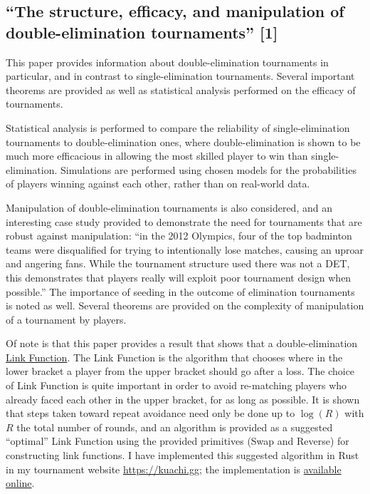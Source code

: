 \documentclass[a4,11pt,twoside,final]{article}
\makeatletter
\newcommand{\cslcitation}[2]
 {\protect\hyper@linkstart{cite}{citeproc_bib_item_#1}#2\hyper@linkend}
\makeatother
\begin{document}
\subsection{``The structure, efficacy, and manipulation of double-elimination tournaments'' \cslcitation{1}{[1]}}
\label{sec:org9284aad}

This paper provides information about double-elimination tournaments in
particular, and in contrast to single-elimination tournaments. Several important
theorems are provided as well as statistical analysis performed on the efficacy
of tournaments.

Statistical analysis is performed to compare the reliability of
single-elimination tournaments to double-elimination ones, where
double-elimination is shown to be much more efficacious in allowing the most
skilled player to win than single-elimination. Simulations are performed using
chosen models for the probabilities of players winning against each other, rather
than on real-world data.

Manipulation of double-elimination tournaments is also considered, and an
interesting case study provided to demonstrate the need for tournaments that are
robust against manipulation: ``in the 2012 Olympics, four of the top badminton
teams were disqualified for trying to intentionally lose matches, causing an
uproar and angering fans. While the tournament structure used there was not a
DET, this demonstrates that players really will exploit poor tournament design
when possible.'' The importance of seeding in the outcome of elimination
tournaments is noted as well. Several theorems are provided on the complexity of
manipulation of a tournament by players.

Of note is that this paper provides a result that shows that a
double-elimination \uline{Link Function}. The Link Function is the algorithm that
chooses where in the lower bracket a player from the upper bracket should go
after a loss. The choice of Link Function is quite important in order to avoid
re-matching players who already faced each other in the upper bracket, for as long
as possible. It is shown that steps taken toward repeat avoidance need only be
done up to \(\log(R)\) with \(R\) the total number of rounds, and an algorithm is
provided as a suggested ``optimal'' Link Function using the provided primitives
(Swap and Reverse) for constructing link functions. I have implemented this
suggested algorithm in Rust in my tournament website \url{https://kuachi.gg}; the
implementation is \href{https://gitlab.com/\_mike/kuachicups/-/blob/master/server/src/db/tables/cup/stage/elim\_bracket/link\_fun.rs}{available online}.
\end{document}
